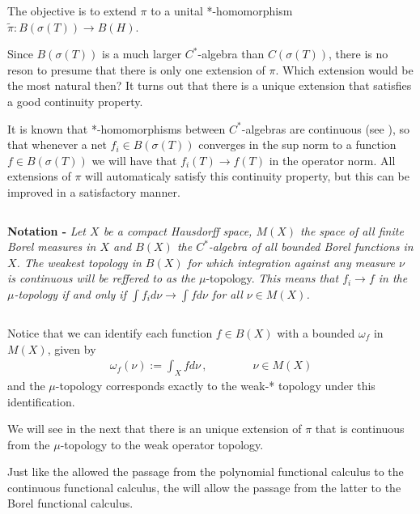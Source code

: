 \documentclass[12pt]{article}
\begin{document}
The objective is to extend $\pi$ to a unital *-homomorphism $\widetilde{\pi}: B(\sigma(T)) \longrightarrow B(H)$.

Since $B(\sigma(T))$ is a much larger $C^*$-algebra than $C(\sigma(T))$, there is no reson to presume that there is only one extension of $\pi$. Which extension would be the most natural then? It turns out that there is a unique extension that satisfies a good continuity property.

It is known that *-homomorphisms between $C^*$-algebras are continuous (see ), so that whenever a net $f_i \in B(\sigma(T))$ converges in the sup norm to a function $f \in B(\sigma(T))$ we will have that $f_i(T) \to f(T)$ in the operator norm. All extensions of $\pi$ will automaticaly satisfy this continuity property, but this can be improved in a satisfactory manner.

$\,$

{\bf Notation -} \emph{Let $X$ be a compact Hausdorff space, $M(X)$ the space of all finite  Borel measures in $X$ and $B(X)$ the $C^*$-algebra of all bounded Borel functions in $X$. The weakest topology in $B(X)$ for which integration against any measure $\nu$ is continuous will be reffered to as the} $\mu$-topology. \emph{This means that $f_i \to f$ in the $\mu$-topology if and only if $\int f_i d\nu \to \int f d\nu$ for all $\nu \in M(X)$.}

$\,$

Notice that we can identify each function $f \in B(X)$ with a bounded  $\omega_f$ in $M(X)$, given by
\begin{align*}
\omega_f (\nu):= \int_X f d \nu\,, \qquad\qquad \nu \in M(X)
\end{align*}
and the $\mu$-topology corresponds exactly to the weak-* topology under this identification.

We will see in the next  that there is an unique extension of $\pi$ that is continuous from the $\mu$-topology to the weak operator topology.

Just like the  allowed the passage from the polynomial functional calculus to the continuous functional calculus, the  will allow the passage from the latter to the Borel functional calculus.
\end{document}
